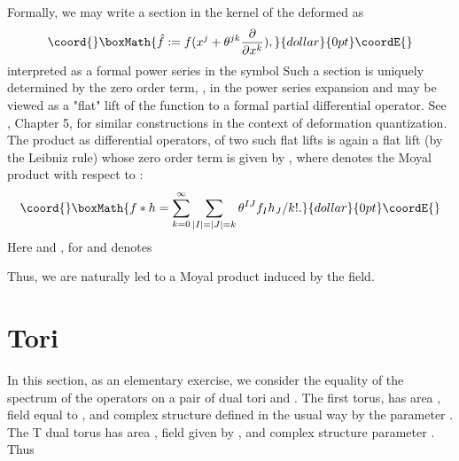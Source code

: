\documentclass[a4paper,11pt]{amsart}
\begin{document}
 
Formally, we may write a section in the kernel of the deformed \coordHE{} 
as 
$$\coord{}\boxMath{\hat f:= f(x^j + \theta^{jk}\frac{\partial}{\partial x^k}),}{dollar}{0pt}\coordE{}$$
interpreted as a formal power series in the symbol 
\coordHE{} Such a section is uniquely determined by 
the zero order term, \coordHE{}, in the power series expansion and may be viewed as a 
"flat" lift of the function \coordHE{}  to a formal partial differential operator. See 
\cite{Fed}, Chapter 5, for similar constructions in the context of deformation
quantization. The product as differential operators, \coordHE{}  of
 two such flat lifts is 
again a flat lift (by the Leibniz rule) whose zero order term 
is given by \coordHE{}, where \myHighlight{$\ast$}\coordHE{} denotes the Moyal product with respect to 
 \coordHE{}: 
$$\coord{}\boxMath{f\ast h = \sum_{k=0}^{\infty}\sum_{|I| = |J| = k}\theta^{IJ}f_Ih_J/k!.}{dollar}{0pt}\coordE{}$$
Here \coordHE{} 
and \coordHE{}, for \coordHE{} and
 denotes \coordHE{}

Thus, we are naturally led to a Moyal product induced by the \coordHE{} field.   
 


\section{Tori}
In this section, as an elementary exercise, we consider the equality 
of the spectrum of 
the operators \coordHE{} on a pair of \coordHE{} dual tori \coordHE{}
and \coordHE{}. The
first torus, \coordHE{}  has area \coordHE{}, \coordHE{} field equal to \coordHE{}, and complex structure
defined in the usual way by the parameter \coordHE{}. The 
T dual torus has area \coordHE{}, \coordHE{} field given by \coordHE{}, and
 complex structure parameter \coordHE{}. Thus
 
\end{document}
